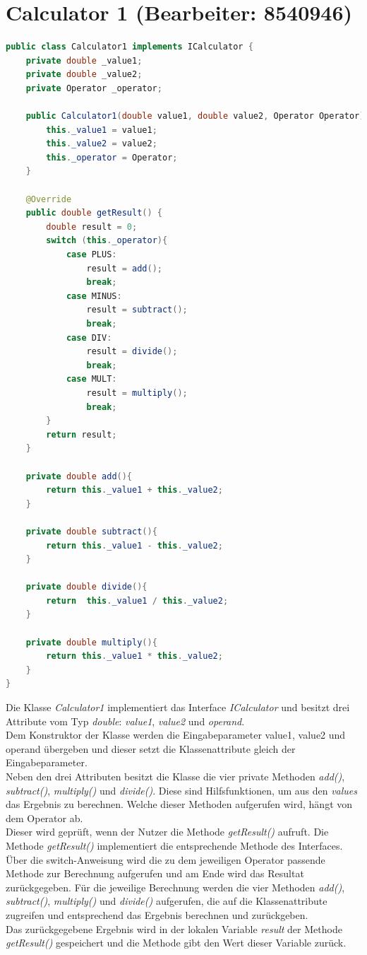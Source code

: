 \chapter{Calculator 1 (Bearbeiter: 8540946)}
\begin{lstlisting}[language=Java,basicstyle=\scriptsize, caption= Calculator 1]
public class Calculator1 implements ICalculator {
    private double _value1;
    private double _value2;
    private Operator _operator;

    public Calculator1(double value1, double value2, Operator Operator){
        this._value1 = value1;
        this._value2 = value2;
        this._operator = Operator;
    }

    @Override
    public double getResult() {
        double result = 0;
        switch (this._operator){
            case PLUS:
                result = add();
                break;
            case MINUS:
                result = subtract();
                break;
            case DIV:
                result = divide();
                break;
            case MULT:
                result = multiply();
                break;
        }
        return result;
    }

    private double add(){
        return this._value1 + this._value2;
    }

    private double subtract(){
        return this._value1 - this._value2;
    }

    private double divide(){
        return  this._value1 / this._value2;
    }

    private double multiply(){
        return this._value1 * this._value2;
    }
}
\end{lstlisting}
Die Klasse \textit{Calculator1} implementiert das Interface \textit{ICalculator} und besitzt drei Attribute vom Typ \textit{double}: \textit{\textunderscore value1}, \textit{\textunderscore value2} und \textit{\textunderscore operand}.\\
Dem Konstruktor der Klasse werden die Eingabeparameter value1, value2 und operand übergeben und dieser setzt die Klassenattribute gleich der Eingabeparameter.\\
Neben den drei Attributen besitzt die Klasse die vier private Methoden \textit{add()}, \textit{subtract()}, \textit{multiply()} und \textit{divide()}.
Diese sind Hilfsfunktionen, um aus den \textit{values} das Ergebnis zu berechnen.
Welche dieser Methoden aufgerufen wird, hängt von dem Operator ab.\\
Dieser wird geprüft, wenn der Nutzer die Methode \textit{getResult()} aufruft.
Die Methode \textit{getResult()} implementiert die entsprechende Methode des Interfaces.
Über die switch-Anweisung wird die zu dem jeweiligen Operator passende Methode zur Berechnung aufgerufen und am Ende wird das Resultat zurückgegeben.
Für die jeweilige Berechnung werden die vier Methoden \textit{add()}, \textit{subtract()}, \textit{multiply()} und \textit{divide()} aufgerufen, die auf die Klassenattribute zugreifen und entsprechend das Ergebnis berechnen und zurückgeben.\\
Das zurückgegebene Ergebnis wird in der lokalen Variable \textit{result} der Methode \textit{getResult()} gespeichert und die Methode gibt den Wert dieser Variable zurück.
